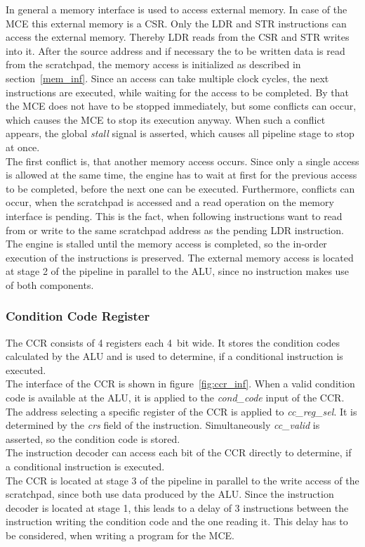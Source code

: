 In general a memory interface is used to access external memory.
In case of the MCE this external memory is a CSR.
Only the LDR and STR instructions can access the external memory.
Thereby LDR reads from the CSR and STR writes into it.
After the source address and if necessary the to be written data is read from the scratchpad, the memory access is initialized as described in section~\ref{mem_inf}.
Since an access can take multiple clock cycles, the next instructions are executed, while waiting for the access to be completed.
By that the MCE does not have to be stopped immediately, but some conflicts can occur, which causes the MCE to stop its execution anyway.
When such a conflict appears, the global \emph{stall} signal is asserted, which causes all pipeline stage to stop at once.\\
The first conflict is, that another memory access occurs.
Since only a single access is allowed at the same time, the engine has to wait at first for the previous access to be completed, before the next one can be executed.
Furthermore, conflicts can occur, when the scratchpad is accessed and a read operation on the memory interface is pending.
This is the fact, when following instructions want to read from or write to the same scratchpad address as the pending LDR instruction.
The engine is stalled until the memory access is completed, so the in-order execution of the instructions is preserved.
The external memory access is located at stage 2 of the pipeline in parallel to the ALU, since no instruction makes use of both components.

\subsubsection{Condition Code Register}

The CCR consists of 4 registers each 4~bit wide.
It stores the condition codes calculated by the ALU and is used to determine, if a conditional instruction is executed.\\
The interface of the CCR is shown in figure~\ref{fig:ccr_inf}.
When a valid condition code is available at the ALU, it is applied to the \emph{cond\_code} input of the CCR.
The address selecting a specific register of the CCR is applied to \emph{cc\_reg\_sel}.
It is determined by the \emph{crs} field of the instruction.
Simultaneously \emph{cc\_valid} is asserted, so the condition code is stored.\\
The instruction decoder can access each bit of the CCR directly to determine, if a conditional instruction is executed.\\
The CCR is located at stage 3 of the pipeline in parallel to the write access of the scratchpad, since both use data produced by the ALU.
Since the instruction decoder is located at stage 1, this leads to a delay of 3 instructions between the instruction writing the condition code and the one reading it. This delay has to be considered, when writing a program for the MCE.


